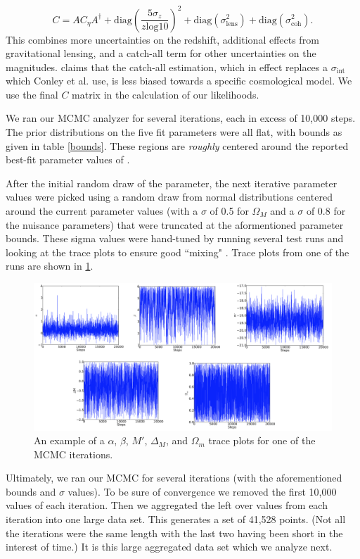 \documentclass[aps,prl,reprint]{revtex4-1}
\begin{document}
$$C = A C_\eta A^\dagger + \text{diag}(\frac{5\sigma_z}{z \text{log} 10})^2 + \text{diag}(\sigma_\text{lens}^2) + \text{diag}(\sigma_{\text{coh}}^2). $$
This combines more uncertainties on the redshift, additional effects from gravitational lensing, and a catch-all term for other uncertainties on the magnitudes. \cite{sdss} claims that the catch-all estimation, which in effect replaces a $\sigma_\text{int}$ which Conley et al. use, is less biased towards a specific cosmological model. We use the final $C$ matrix in the calculation of our likelihoods. 

\par We ran our MCMC analyzer for several iterations, each in excess of 10,000 steps. The prior distributions on the five fit parameters were all flat, with bounds as given in table \ref{bounds}. These regions are \textit{roughly} centered around the reported best-fit parameter values of \citep{sdss}.
\par After the initial random draw of the parameter, the next iterative parameter values were picked using a random draw from normal distributions centered around the current parameter values (with a $\sigma$ of 0.5 for $\Omega_M$ and a $\sigma$ of 0.8 for the nuisance parameters) that were truncated at the aformentioned parameter bounds. These sigma values were hand-tuned by running several test runs and looking at the trace plots to ensure good ``mixing" \cite{MC}. Trace plots from one of the runs are shown in \cref{fig:trace}. 
\onecolumngrid


\begin{figure}[t!]
 \centering
 \includegraphics[width=.8\textwidth]{../plots/SN_trace.pdf}
 \centering
\caption{\label{fig:trace}An example of a $\alpha$, $\beta$, $M'$, $\Delta_M$, and $\Omega_m$ trace plots for one of the MCMC iterations.}
\end{figure}
\twocolumngrid
Ultimately, we ran our MCMC for several iterations (with the aforementioned bounds and $\sigma$ values). To be sure of convergence we removed the first 10,000 values of each iteration. Then we aggregated the left over values from each iteration into one large data set. This generates a set of 41,528 points. (Not all the iterations were the same length with the last two having been short in the interest of time.) It is this large aggregated data set which we analyze next.
\end{document}
